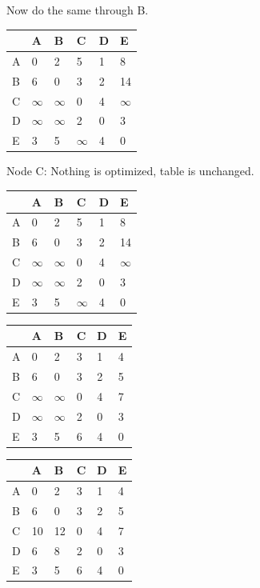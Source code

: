 \documentclass{article}
\begin{document}
\begin{enumerate}
Now do the same through B. 
\begin{table}[H]
\begin{tabular}{|l|l|l|l|l|l|}
\hline
 & A & B & C & D & E \\ \hline
A & 0 & 2 & 5 & 1 & 8 \\ \hline
B & 6 & 0 & 3 & 2 & 14 \\ \hline
C & $\infty$ & $\infty$ & 0 & 4 & $\infty$ \\ \hline
D & $\infty$ & $\infty$ & 2 & 0 & 3 \\ \hline
E & 3 & 5 & $\infty$ & 4 & 0 \\ \hline
\end{tabular}
\end{table}

Node C: Nothing is optimized, table is unchanged. 

\begin{table}[H]
\begin{tabular}{|l|l|l|l|l|l|}
\hline
 & A & B & C & D & E \\ \hline
A & 0 & 2 & 5 & 1 & 8 \\ \hline
B & 6 & 0 & 3 & 2 & 14 \\ \hline
C & $\infty$ & $\infty$ & 0 & 4 & $\infty$ \\ \hline
D & $\infty$ & $\infty$ & 2 & 0 & 3 \\ \hline
E & 3 & 5 & $\infty$ & 4 & 0 \\ \hline
\end{tabular}
\end{table}



\begin{table}[H]
\begin{tabular}{|l|l|l|l|l|l|}
\hline
 & A & B & C & D & E \\ \hline
A & 0 & 2 & 3 & 1 & 4 \\ \hline
B & 6 & 0 & 3 & 2 & 5 \\ \hline
C & $\infty$ & $\infty$ & 0 & 4 & 7 \\ \hline
D & $\infty$ & $\infty$ & 2 & 0 & 3 \\ \hline
E & 3 & 5 & 6 & 4 & 0 \\ \hline
\end{tabular}
\end{table}


\begin{table}[H]
\begin{tabular}{|l|l|l|l|l|l|}
\hline
 & A & B & C & D & E \\ \hline
A & 0 & 2 & 3 & 1 & 4 \\ \hline
B & 6 & 0 & 3 & 2 & 5 \\ \hline
C & 10 & 12 & 0 & 4 & 7 \\ \hline
D & 6 & 8 & 2 & 0 & 3 \\ \hline
E & 3 & 5 & 6 & 4 & 0 \\ \hline
\end{tabular}
\end{table}




\end{enumerate}
\end{document}
